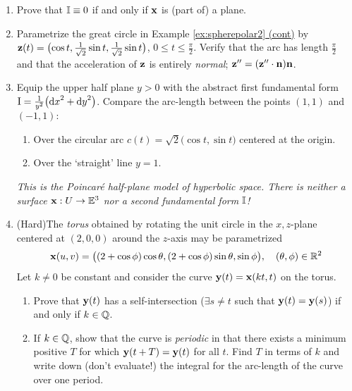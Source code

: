 \begin{exercises}
\begin{enumerate}
	  
	  \item Prove that $\mathbb{I}\equiv 0$ if and only if ${\mathbf{x}}$ is (part of) a plane.
	
	
		\item Parametrize the great circle in Example \hyperlink{ex:spherepolar4}{\ref*{ex:spherepolar2} (cont)} by ${\mathbf{z}}(t)=\bigl(\cos t,{\frac 1{\sqrt 2}\sin t,\frac 1{\sqrt 2}}\sin t\bigr)$, $0\le t\le \frac\pi 2$. Verify that the arc has length $\frac\pi 2$ and that the acceleration of ${\mathbf{z}}$ is entirely \emph{normal}; ${\mathbf{z}}''=({\mathbf{z}}''\cdot{\mathbf{n}}){\mathbf{n}}$.
			
	  
	  \item\label{exs:poincarehalfplane} Equip the upper half plane $y>0$ with the abstract first fundamental form $\mathrm{I}=\smash{\frac 1{y^2}}\bigl({\mathrm{d} x}^2+{\mathrm{d} y}^2\bigr)$. Compare the arc-length between the points $(1,1)$ and $(-1,1)$:
	  \begin{enumerate}
	    \item Over the circular arc $c(t)=\sqrt 2\bigl(\cos t,\sin t\bigr)$ centered at the origin.
	    \item Over the `straight' line $y=1$.
	  \end{enumerate}
	  \emph{This is the Poincaré half-plane model of hyperbolic space. There is neither a surface ${\mathbf{x}}:U\to\mathbb{E}^3$ nor a second fundamental form $\mathbb{I}$!}
	  
	  
	  \item (Hard)\lstsp The \emph{torus} obtained by rotating the unit circle in the $x,z$-plane centered at $(2,0,0)$ around the $z$-axis may be parametrized
	  \[
	  	{\mathbf{x}}(u,v)=\bigl((2+\cos \phi)\cos\theta,(2+\cos\phi)\sin\theta,\sin\phi\bigr),\quad (\theta,\phi)\in\mathbb{R}^2
	  \]
	  Let $k\neq 0$ be constant and consider the curve ${\mathbf{y}}(t)={\mathbf{x}}(kt,t)$ on the torus.
	  \begin{enumerate}
	    \item Prove that ${\mathbf{y}}(t)$ has a self-intersection ($\exists s\neq t$ such that ${\mathbf{y}}(t)={\mathbf{y}}(s)$) if and only if $k\in\mathbb{Q}$.
	    \item If $k\in\mathbb{Q}$, show that the curve is \emph{periodic} in that there exists a minimum positive $T$ for which ${\mathbf{y}}(t+T)={\mathbf{y}}(t)$ for all $t$. Find $T$ in terms of $k$ and write down (don't evaluate!) the integral for the arc-length of the curve over one period.
	  \end{enumerate}
		
	\end{enumerate}
\end{exercises}

\clearpage



